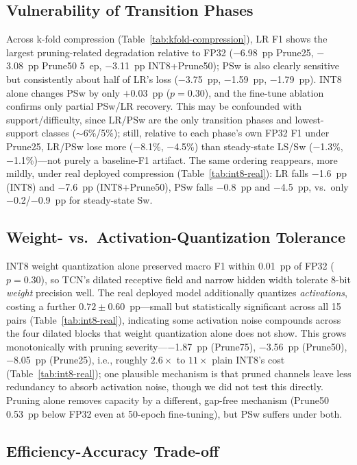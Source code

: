 \documentclass[conference]{IEEEtran}
\begin{document}
\subsection{Vulnerability of Transition Phases}

Across k-fold compression (Table~\ref{tab:kfold-compression}), LR F1 shows the largest
pruning-related degradation relative to FP32 ($-$6.98~pp Prune25, $-$3.08~pp Prune50 5~ep,
$-$3.11~pp INT8+Prune50); PSw is also clearly sensitive but consistently about half of LR's loss
($-$3.75~pp, $-$1.59~pp, $-$1.79~pp). INT8 alone changes PSw by only $+0.03$~pp ($p{=}0.30$), and
the fine-tune ablation confirms only partial PSw/LR recovery. This may be confounded with
support/difficulty, since LR/PSw are the only transition phases and lowest-support classes
($\sim$6\%/5\%); still, relative to each phase's own FP32 F1 under Prune25, LR/PSw lose more
($-$8.1\%, $-$4.5\%) than steady-state LS/Sw ($-$1.3\%, $-$1.1\%)---not purely a baseline-F1
artifact. The same ordering reappears, more mildly, under real deployed compression
(Table~\ref{tab:int8-real}): LR falls $-$1.6~pp (INT8) and $-$7.6~pp (INT8+Prune50), PSw falls
$-$0.8~pp and $-$4.5~pp, vs.\ only $-$0.2/$-$0.9~pp for steady-state Sw.

\subsection{Weight- vs.\ Activation-Quantization Tolerance}

INT8 weight quantization alone preserved macro F1 within 0.01~pp of FP32 ($p{=}0.30$), so TCN's
dilated receptive field and narrow hidden width tolerate 8-bit \emph{weight} precision well. The
real deployed model additionally quantizes \emph{activations}, costing a further
$0.72\pm0.60$~pp---small but statistically significant across all 15 pairs (Table~\ref{tab:int8-real}),
indicating some activation noise compounds across the four dilated blocks that weight quantization
alone does not show. This grows monotonically with pruning severity---$-$1.87~pp (Prune75),
$-$3.56~pp (Prune50), $-$8.05~pp (Prune25), i.e., roughly $2.6\times$ to $11\times$ plain INT8's
cost (Table~\ref{tab:int8-real}); one plausible mechanism is that pruned channels leave less
redundancy to absorb activation noise, though we did not test this directly. Pruning alone removes
capacity by a different,
gap-free mechanism (Prune50 0.53~pp below FP32 even at 50-epoch fine-tuning), but PSw suffers under
both.

\subsection{Efficiency-Accuracy Trade-off}
\end{document}

